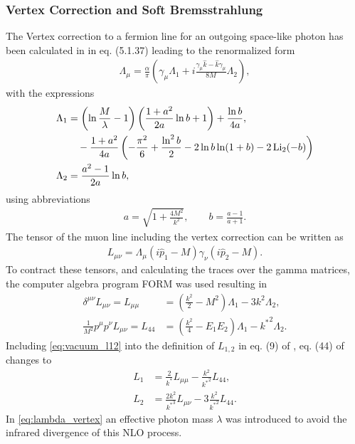 \subsubsection{Vertex Correction and Soft Bremsstrahlung}

The Vertex correction to a fermion line for an outgoing space-like photon has been calculated in \cite{Akhiezer81} in eq. (5.1.37) leading to the renormalized form
\begin{align}
    \Lambda_\mu = \frac{\alpha}{\pi} \left( \gamma_\mu \Lambda_1 + i \frac{\gamma_\mu \hat{k} - \hat{k} \gamma_\mu}{8 M} \Lambda_2 \right) ,
\end{align}
with the expressions
\begin{subequations} \label{eq:lambda_vertex}
\begin{align}
    \Lambda_1 &= \left( \operatorname{ln} \frac{M}{\lambda} - 1 \right)
        \left( \frac{1 + a^2}{2a} \operatorname{ln} b + 1 \right)
        + \frac{\operatorname{ln} b}{4a} ,
        \\
        &\quad - \frac{1 + a^2}{4a} \left( -\frac{\pi^2}{6} + \frac{\operatorname{ln}^2 b}{2} - 2 \operatorname{ln} b \operatorname{ln}(1 + b) - 2 \operatorname{Li_2} (-b) \right) \nonumber \\
    \Lambda_2 &= \frac{a^2 - 1}{2a} \operatorname{ln} b ,
\end{align}
\end{subequations}
using abbreviations
\begin{align}
    a = \sqrt{1 + \frac{4 M^2}{k^2}}, \qquad
    b = \frac{a - 1}{a + 1}.
\end{align}
The tensor of the muon line including the vertex correction can be written as 
\begin{align}
    L_{\mu\nu} = \Lambda_{\mu} (i \hat{p}_1 - M) \gamma_\nu (i \hat{p}_2 - M) .
\end{align}
To contract these tensors, and calculating the traces over the gamma matrices, the computer algebra program FORM \cite{Vermaseren00Form} was used resulting in
\begin{subequations} \label{eq:vacuum_l12}
\begin{align}
    \delta^{\mu\nu} L_{\mu\nu} = L_{\mu\mu} &= \left( \frac{k^2}{2} - M^2 \right) \Lambda_1 - 3 k^2 \Lambda_2, \\
    \frac{1}{M^2} p^\mu p^\nu L_{\mu\nu} = L_{44} &= \left( \frac{k^2}{4} - E_1 E_2 \right)\Lambda_1 - {k^{\ast}}^2 \Lambda_2 .
\end{align}
\end{subequations}
Including \eqref{eq:vacuum_l12} into the definition of $L_{1,2}$ in eq. (9) of \cite{Bugaev77}, eq. (44) of \cite{Bugaev77} changes to
\begin{subequations}
\begin{align}
    L_1 &= \frac{2}{k^\ast} L_{\mu\mu} - \frac{k^2}{{k^{\ast}}^2} L_{44}, \\
    L_2 &= \frac{2k^2}{{k^{\ast}}^3} L_{\mu\nu} - 3\frac{k^2}{{k^{\ast}}^2} L_{44} .
\end{align}
\end{subequations}
In \eqref{eq:lambda_vertex} an effective photon mass $\lambda$ was introduced to avoid the infrared divergence of this NLO process.

